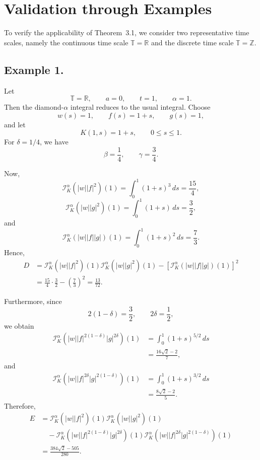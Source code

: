 \documentclass[11pt]{article}
\begin{document}
\section{Validation through Examples}

To verify the applicability of Theorem~3.1, we consider two representative
time scales, namely the continuous time scale $\mathbb{T}=\mathbb{R}$ and the
discrete time scale $\mathbb{T}=\mathbb{Z}$.

\subsection{Example 1.}

Let
\[
    \mathbb{T}=\mathbb{R}, \qquad a=0, \qquad t=1, \qquad \alpha=1.
\]
Then the diamond-$\alpha$ integral reduces to the usual integral. Choose
\[
    w(s)=1, \qquad f(s)=1+s, \qquad g(s)=1,
\]
and let
\[
    K(1,s)=1+s, \qquad 0\leq s\leq 1.
\]
For $\delta=1/4$, we have
\[
    \beta=\frac14, \qquad \gamma=\frac34.
\]

Now,
\[
\mathcal{I}_{K}^{\alpha}(|w||f|^2)(1)
=
\int_0^1 (1+s)^3\,ds
=
\frac{15}{4},
\]
\[
\mathcal{I}_{K}^{\alpha}(|w||g|^2)(1)
=
\int_0^1 (1+s)\,ds
=
\frac32,
\]
and
\[
\mathcal{I}_{K}^{\alpha}(|w||f||g|)(1)
=
\int_0^1 (1+s)^2\,ds
=
\frac73.
\]
Hence,
\[
\begin{aligned}
D
&=
\mathcal{I}_{K}^{\alpha}(|w||f|^2)(1)
\mathcal{I}_{K}^{\alpha}(|w||g|^2)(1)
-
\left[
\mathcal{I}_{K}^{\alpha}(|w||f||g|)(1)
\right]^2  \\
&=
\frac{15}{4}\cdot\frac32-\left(\frac73\right)^2
=
\frac{13}{72}.
\end{aligned}
\]

Furthermore, since
\[
    2(1-\delta)=\frac32,
    \qquad
    2\delta=\frac12,
\]
we obtain
\[
\begin{aligned}
\mathcal{I}_{K}^{\alpha}
\left(|w||f|^{2(1-\delta)}|g|^{2\delta}\right)(1)
&=
\int_0^1 (1+s)^{5/2}\,ds  \\
&=
\frac{16\sqrt{2}-2}{7},
\end{aligned}
\]
and
\[
\begin{aligned}
\mathcal{I}_{K}^{\alpha}
\left(|w||f|^{2\delta}|g|^{2(1-\delta)}\right)(1)
&=
\int_0^1 (1+s)^{3/2}\,ds  \\
&=
\frac{8\sqrt{2}-2}{5}.
\end{aligned}
\]
Therefore,
\[
\begin{aligned}
E
&=
\mathcal{I}_{K}^{\alpha}(|w||f|^2)(1)
\mathcal{I}_{K}^{\alpha}(|w||g|^2)(1)  \\
&\quad -
\mathcal{I}_{K}^{\alpha}
\left(|w||f|^{2(1-\delta)}|g|^{2\delta}\right)(1)
\mathcal{I}_{K}^{\alpha}
\left(|w||f|^{2\delta}|g|^{2(1-\delta)}\right)(1) \\
&=
\frac{384\sqrt{2}-505}{280}.
\end{aligned}
\]
\end{document}

